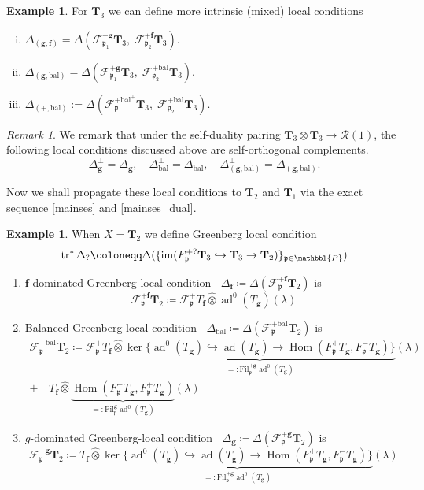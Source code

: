 \documentclass[10pt]{amsart}
\numberwithin{equation}{section}
\theoremstyle{definition}
\newtheorem{exmp}[thm]{Example}
\theoremstyle{remark} %
\newtheorem{rmk}[thm]{Remark}
\newcommand{\mbf}{\mathbf}
\newcommand{\ad}{\operatorname{ad}}
\newcommand{\Hom}{\operatorname{Hom}}
\DeclareMathOperator{\im}{im}
\DeclareMathOperator{\tr}{{tr}^*}
\renewcommand{\b}{\mathrm{bal}}
\newcommand{\f}{\mathbf{f}}
\newcommand{\scrF}{\mathscr{F}}
\newcommand{\g}{\mathbf{g}}
\newcommand{\p}{\mathfrak{p}}
\newcommand{\bP}{\mathbbl{P}}
\newcommand{\R}{\mathcal{R}}
\newcommand{\T}{\mathbf{T}}
\begin{document}
	\begin{exmp}
		For $ \T_{3} $ we can define more intrinsic (mixed) local conditions
		\begin{enumerate}[(i)]
			\item  $ \Delta_{(\g, \f)} = \Delta (\scrF^{+\mbf{g}}_{\p_1}\T_3, \; \scrF^{+\mathbf{f}}_{\p_2}\T_3) $.
			\item $ \Delta_{(\g, \b)} = \Delta (\scrF^{+\mbf{g}}_{\p_1}\T_3, \; \scrF^{+\b}_{\p_2}\T_3) $.
			\item $ \Delta_{(+,\b)}:=\Delta(\scrF^{+\mathrm{bal}^+}_{\p_1}\T_3, \; \scrF^{+\b}_{\p_2}\T_3) $.
			
		\end{enumerate}
	\end{exmp}		
	\begin{rmk}
		We remark that under the self-duality pairing $ \T_{3} \otimes\T_{3} \rightarrow \R(1) $, the following local conditions discussed above are self-orthogonal complements. 
		$$ \Delta_{\g}^{\perp} = \Delta_{\g}, \quad \Delta_{\b}^{\perp} = \Delta_{\b}, \quad \Delta_{(\g,\b)}^{\perp} = \Delta_{(\g,\b)}.$$
		
	\end{rmk}
	Now we shall propagate these local conditions to $ \T_2 $ and $ \T_{1} $ via the exact sequence \eqref{mainses} and \eqref{mainses_dual}.
	\begin{exmp}
		When $ X = \T_2 $ we define Greenberg local condition $$ \tr \Delta_? \coloneqq \Delta( \{\im(F_\p^{+?}\T_{3} \hookrightarrow \T_{3} \rightarrow \T_{2} )\}_{\p \in \bP}) $$ 
		\begin{enumerate}[label=(\roman*)]
			\item $\f$-dominated Greenberg-local condition $ \tr \Delta_{\f}\coloneqq \Delta(\scrF^{+\mathbf{f}}_{\p}\T_{2}) $ is 
			$$ \scrF^{+\mathbf{f}}_{\p}\T_{2} \coloneqq \scrF^{+}_{\p}T_{\f} \widehat{\otimes} \ad^0(T_{\g})(\lambda) $$
			\item Balanced Greenberg-local condition $ \tr \Delta_{\b}\coloneqq \Delta(\scrF^{+\mathrm{bal}}_{\p}\T_{2}) $ is
			\begin{align*}
				\scrF^{+\mathrm{bal}}_{\p}\T_{2} \coloneqq \scrF^{+}_{\p}T_{\f} \widehat{\otimes} \underbrace{\ker\{\ad^0(T_\g) \hookrightarrow \ad(T_\g) \rightarrow \Hom(F_{\p}^+ T_\g,F_{\p}^- T_\g) \}}_{=:\mathrm{Fil}^{+\g}_{\p} \ad^0(T_\g)}(\lambda) \quad \\
				+  \quad T_\f \widehat{\otimes} \underbrace{\Hom(F_{\p}^- T_\g,F_{\p}^+  T_\g)}_{=:\mathrm{Fil}^{\g}_{\p}\ad^0(T_\g)}(\lambda)
			\end{align*} 
			\item $ g $-dominated Greenberg-local condition $ \tr \Delta_{\g} \coloneqq \Delta(\scrF^{+\g}_{\p}\T_{2}) $ is
			$$ \scrF^{+\g}_{\p}\T_{2} \coloneqq T_{\f} \widehat{\otimes} \underbrace{\ker\{\ad^0(T_\g) \hookrightarrow \ad(T_\g) \rightarrow \Hom(F_{\p}^+ T_\g,F_{\p}^- T_\g) \}}_{=:\mathrm{Fil}^{+\g}_{\p} \ad^0(T_\g)}(\lambda) $$
		\end{enumerate}
		
	\end{exmp}
\end{document}
